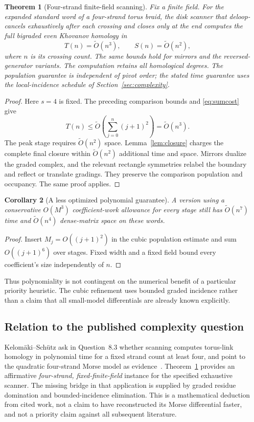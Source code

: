 \documentclass[11pt,letterpaper]{article}
\newtheorem{theorem}{Theorem}[section]
\newtheorem{corollary}[theorem]{Corollary}
\theoremstyle{remark}\newtheorem{remark}[theorem]{Remark}
\begin{document}
\begin{theorem}[Four-strand finite-field scanning]\label{thm:torus}
Fix a finite field. For the expanded standard word of a four-strand torus braid, the disk scanner that deloop-cancels exhaustively after each crossing and closes only at the end computes the full bigraded even Khovanov homology in
\begin{equation}\label{eq:cubic}
 T(n)=\widetilde O(n^3),\qquad S(n)=\widetilde O(n^2),
\end{equation}
where $n$ is its crossing count. The same bounds hold for mirrors and the reversed-generator variants. The computation retains all homological degrees. The population guarantee is independent of pivot order; the stated time guarantee uses the local-incidence schedule of Section~\ref{sec:complexity}.
\end{theorem}
\begin{proof}
Here $s=4$ is fixed. The preceding comparison bounds and \eqref{eq:sumcost} give
\[
 T(n)\le\widetilde O\!\left(\sum_{j=0}^n(j+1)^2\right)
 =\widetilde O(n^3).
\]
The peak stage requires $\widetilde O(n^2)$ space. Lemma~\ref{lem:closure} charges the complete final closure within $\widetilde O(n^2)$ additional time and space. Mirrors dualize the graded complex, and the relevant rectangle symmetries relabel the boundary and reflect or translate gradings. They preserve the comparison population and occupancy. The same proof applies.
\end{proof}

\begin{corollary}[A less optimized polynomial guarantee]\label{cor:dense}
A version using a conservative $O(M^3)$ coefficient-work allowance for every stage still has $\widetilde O(n^7)$ time and $\widetilde O(n^4)$ dense-matrix space on these words.
\end{corollary}
\begin{proof}
Insert $M_j=O((j+1)^2)$ in the cubic population estimate and sum $O((j+1)^6)$ over stages. Fixed width and a fixed field bound every coefficient's size independently of $n$.
\end{proof}
Thus polynomiality is not contingent on the numerical benefit of a particular priority heuristic. The cubic refinement uses bounded graded incidence rather than a claim that all small-model differentials are already known explicitly.

\subsection{Relation to the published complexity question}
Kelom\"aki--Sch\"utz ask in Question~8.3 whether scanning computes torus-link homology in polynomial time for a fixed strand count at least four, and point to the quadratic four-strand Morse model as evidence~\cite{KS26}. Theorem~\ref{thm:torus} provides an affirmative \emph{four-strand, fixed-finite-field} instance for the specified exhaustive scanner. The missing bridge in that application is supplied by graded residue domination and bounded-incidence elimination. This is a mathematical deduction from cited work, not a claim to have reconstructed its Morse differential faster, and not a priority claim against all subsequent literature.
\end{document}

